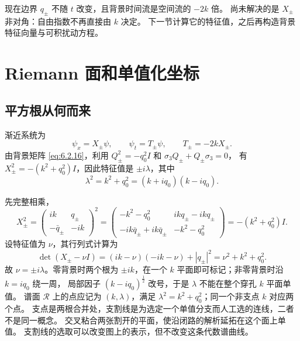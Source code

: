\documentclass[lang=cn,scheme=chinese,mode=simple,device=normal,color=blue,
math=cm,thmcnt=section,12pt]{elegantbook}
\newcommand{\eqq}[2]{\tag{#1}\label{eq:#1}#2}
\begin{document}
\begin{callout}
    现在边界 $q_\pm$ 不随 $t$ 改变，且背景时间流是空间流的 $-2k$ 倍。
    尚未解决的是 $X_\pm$ 非对角：自由指数不再直接由 $k$ 决定。
    下一节计算它的特征值，之后再构造背景特征向量与可积扰动方程。
\end{callout}

\section{Riemann 面和单值化坐标}
\subsection{平方根从何而来}
渐近系统为
\begin{equation}\eqq{6.3.1}{\psi_x=X_\pm\psi,\qquad\psi_t=T_\pm\psi,\qquad T_\pm=-2kX_\pm.}\end{equation}
由背景矩阵 \eqref{eq:6.2.16}，利用 $Q_\pm^2=-q_0^2I$ 和 $\sigma_3Q_\pm+Q_\pm\sigma_3=0$，
有 $X_\pm^2=-(k^2+q_0^2)I$，因此特征值是 $\pm i\lambda$，其中
\begin{equation}\eqq{6.3.2}{\lambda^2=k^2+q_0^2=(k+iq_0)(k-iq_0).}\end{equation}

\begin{callout}
    先完整相乘，
    \[
        X_\pm^2=\begin{pmatrix}ik&q_\pm\\-\bar q_\pm&-ik\end{pmatrix}^2
        =\begin{pmatrix}-k^2-q_0^2&ikq_\pm-ikq_\pm\\-ik\bar q_\pm+ik\bar q_\pm&-k^2-q_0^2\end{pmatrix}
        =-(k^2+q_0^2)I.
    \]
    设特征值为 $\nu$，其行列式计算为
    \[
        \det(X_\pm-\nu I)=
        (ik-\nu)(-ik-\nu)+|q_\pm|^2
        =\nu^2+k^2+q_0^2.
    \]
    故 $\nu=\pm i\lambda$。零背景时两个根为 $\pm ik$，在一个 $k$ 平面即可标记；非零背景时沿 $k=iq_0$ 绕一周，
    局部因子 $(k-iq_0)^{\frac{1}{2}}$ 改号，于是 $\lambda$ 不能在整个穿孔 $k$ 平面单值。
    谱面 $\mathcal R$ 上的点应记为 $(k,\lambda)$，满足 $\lambda^2=k^2+q_0^2$；同一个非支点 $k$ 对应两个点。
    支点是两根合并处，支割线是为选定一个单值分支而人工选的连线，二者不是同一概念。
    交叉粘合两张割开的平面，使沿闭路的解析延拓在这个面上单值。
    支割线的选取可以改变图上的表示，但不改变这条代数谱曲线。
\end{callout}
\end{document}
